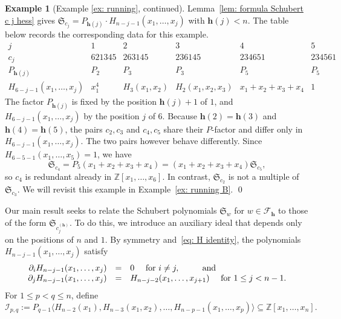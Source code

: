 \documentclass[11pt]{amsart}
\theoremstyle{plain}
\theoremstyle{definition}
\newtheorem{ex}[thm]{Example}
\newcommand{\hess}{{\mathbf h}}
\newcommand{\Z}{\mathbb{ Z}}           %
\newcommand{\exampleqed}{%
    {   
    \renewcommand{\qedsymbol}{$\lozenge$}%
    \qed%
    }
}
\numberwithin{equation}{section}
\begin{document}
\begin{ex}[Example \ref{ex: running}, continued]\label{ex: running part 2}
Lemma~\ref{lem: formula Schubert c j hess} gives $\mathfrak{S}_{c_j}=P_{\hess(j)}\cdot H_{n-j-1}(x_1,\ldots,x_j)$ with $\hess(j) <n$.
The table below records the corresponding data for this example. 
\[
\renewcommand{\arraystretch}{1.2}
\begin{array}{c|ccccc}
j & 1 & 2 & 3 & 4 & 5\\ \hline
c_j & 621345 & 263145 & 236145 & 234651 & 234561\\
P_{\hess(j)} & P_2 & P_3 & P_3 & P_5 & P_5\\
H_{6-j-1}(x_1,\ldots,x_j) & x_1^4 & H_3(x_1,x_2) & H_2(x_1,x_2,x_3) & x_1+x_2+x_3+x_4 & 1
\end{array}
\]
The factor $P_{\hess(j)}$ is fixed by the position $\hess(j)+1$ of $1$, and $H_{6-j-1}(x_1,\ldots,x_j)$ by the position $j$ of $6$. Because $\hess(2)=\hess(3)$ and $\hess(4)=\hess(5)$, the pairs $c_2,c_3$ and $c_4,c_5$ share their $P$-factor and differ only in $H_{6-j-1}(x_1,\ldots,x_j)$. The two pairs however behave differently. Since 
$H_{6-5-1}(x_1,\ldots,x_5)=1$, we have
\begin{equation*}
   \mathfrak{S}_{c_4}=P_5(x_1+x_2+x_3+x_4)=(x_1+x_2+x_3+x_4)\mathfrak{S}_{c_5}, 
\end{equation*}
so $c_4$ is redundant already in $\Z[x_1,\ldots,x_6]$. In contrast, $\mathfrak{S}_{c_2}$ is not a multiple of $\mathfrak{S}_{c_3}$. We will revisit this example in Example~\ref{ex: running B}. 
\exampleqed
\end{ex}




Our main result seeks to relate the Schubert polynomials $\mathfrak{S}_w$ for $w\in\mathcal{F}_\hess$ to those of the form $\mathfrak{S}_{c_j^{(\hess)}}$. To do this, we introduce an auxiliary ideal that depends only on the positions of $n$ and $1$.
By symmetry and~\eqref{eq: H identity}, the polynomials 
$H_{n-j-1}(x_1,\ldots,x_j)$ satisfy
\begin{equation}\label{eq: auxiliary f relations}
\begin{array}{rcl}
\partial_i H_{n-j-1}(x_1,\ldots,x_j) &=& 0\quad \textup{ for } i\neq j,\qquad ~~\mbox{and}\\
\partial_j H_{n-j-1}(x_1,\ldots,x_j) & = & H_{n-j-2}(x_1,\ldots,x_{j+1}) \quad \textup{ for } 1 \leq j<n-1.%
\end{array}
\end{equation}
For $1\leq p<q\leq n$, define
\begin{equation*}
\mathcal{I}_{p,q}:=%
P_{q-1}\langle H_{n-2}(x_1),H_{n-3}(x_1,x_2),\ldots,H_{n-p-1}(x_1,\ldots,x_p) \rangle
\subseteq\Z[x_1,\ldots,x_n].
\end{equation*}
\end{document}

